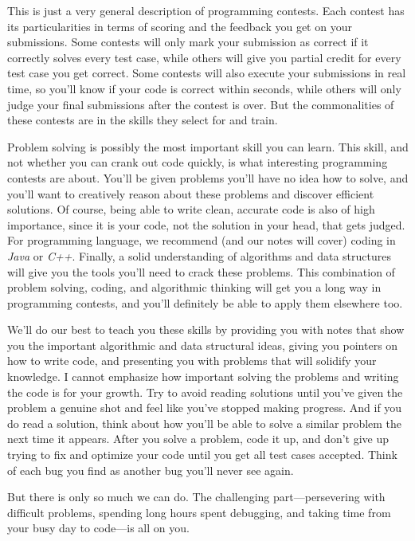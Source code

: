 This is just a very general description of programming contests. Each contest has its particularities in terms of scoring and the feedback you get on your submissions. Some contests will only mark your submission as correct if it correctly solves every test case, while others will give you partial credit for every test case you get correct.  Some contests will also execute your submissions in real time, so you'll know if your code is correct within seconds, while others will only judge your final submissions after the contest is over. But the commonalities of these contests are in the skills they select for and train.

Problem solving is possibly the most important skill you can learn. This skill, and not whether you can crank out code quickly, is what interesting programming contests are about. You'll be given problems you'll have no idea how to solve, and you'll want to creatively reason about these problems and discover efficient solutions. Of course, being able to write clean, accurate code is also of high importance, since it is your code, not the solution in your head, that gets judged. For programming language, we recommend (and our notes will cover) coding in \emph{Java} or \emph{C++}. Finally, a solid understanding of algorithms and data structures will give you the tools you'll need to crack these problems. This combination of problem solving, coding, and algorithmic thinking will get you a long way in programming contests, and you'll definitely be able to apply them elsewhere too.

We'll do our best to teach you these skills by providing you with notes that show you the important algorithmic and data structural ideas, giving you pointers on how to write code, and presenting you with problems that will solidify your knowledge. I cannot emphasize how important solving the problems and writing the code is for your growth. Try to avoid reading solutions until you've given the problem a genuine shot and feel like you've stopped making progress. And if you do read a solution, think about how you'll be able to solve a similar problem the next time it appears. After you solve a problem, code it up, and don't give up trying to fix and optimize your code until you get all test cases accepted. Think of each bug you find as another bug you'll never see again.

But there is only so much we can do. The challenging part---persevering with difficult problems, spending long hours spent debugging, and taking time from your busy day to code---is all on you.

